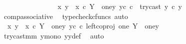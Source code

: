 \begin{isabellebody}
\ \ \ \ \ \ \ \ \ \ \ \ \isamarkupfalse%
\ \isamarkupfalse%
\ {\isachardoublequoteopen}{\isachardot}{\kern0pt}{\isachardot}{\kern0pt}{\isachardot}{\kern0pt}\ {\isacharequal}{\kern0pt}\ {\isacharparenleft}{\kern0pt}{\isasymlangle}x{}{\isacharcomma}{\kern0pt}\ y{}{\isasymrangle}\ {\isasymamalg}\ {\isasymlangle}x{}\ {\isasymcirc}\isactrlsub c\ {\isasymbeta}\isactrlbsub Y\ {\isasymsetminus}\ {\isacharparenleft}{\kern0pt}one{\isacharcomma}{\kern0pt}y{}{\isacharparenright}{\kern0pt}\isactrlesub {\isacharcomma}{\kern0pt}\ y{}\isactrlsup c{\isasymrangle}{\isacharparenright}{\kern0pt}\ {\isasymcirc}\isactrlsub c\ \ try{\isacharunderscore}{\kern0pt}cast\ y{}\ {\isasymcirc}\isactrlsub c\ y{}{\isachardoublequoteclose}\isanewline
\ \ \ \ \ \ \ \ \ \ \ \ \ \ \isamarkupfalse%
\ \ comp{\isacharunderscore}{\kern0pt}associative{}\ \isamarkupfalse%
\ {\isacharparenleft}{\kern0pt}typecheck{\isacharunderscore}{\kern0pt}cfuncs{\isacharcomma}{\kern0pt}\ auto{\isacharparenright}{\kern0pt}\isanewline
\ \ \ \ \ \ \ \ \ \ \ \ \isamarkupfalse%
\ \isamarkupfalse%
\ {\isachardoublequoteopen}{\isachardot}{\kern0pt}{\isachardot}{\kern0pt}{\isachardot}{\kern0pt}\ {\isacharequal}{\kern0pt}\ {\isacharparenleft}{\kern0pt}{\isasymlangle}x{}{\isacharcomma}{\kern0pt}\ y{}{\isasymrangle}\ {\isasymamalg}\ {\isasymlangle}x{}\ {\isasymcirc}\isactrlsub c\ {\isasymbeta}\isactrlbsub Y\ {\isasymsetminus}\ {\isacharparenleft}{\kern0pt}one{\isacharcomma}{\kern0pt}y{}{\isacharparenright}{\kern0pt}\isactrlesub {\isacharcomma}{\kern0pt}\ y{}\isactrlsup c{\isasymrangle}{\isacharparenright}{\kern0pt}\ {\isasymcirc}\isactrlsub c\ left{\isacharunderscore}{\kern0pt}coproj\ one\ {\isacharparenleft}{\kern0pt}Y\ {\isasymsetminus}\ {\isacharparenleft}{\kern0pt}one{\isacharcomma}{\kern0pt}y{}{\isacharparenright}{\kern0pt}{\isacharparenright}{\kern0pt}{\isachardoublequoteclose}\isanewline
\ \ \ \ \ \ \ \ \ \ \ \ \ \ \isamarkupfalse%
\ \ try{\isacharunderscore}{\kern0pt}cast{\isacharunderscore}{\kern0pt}m{\isacharunderscore}{\kern0pt}m\ y{}{\isacharunderscore}{\kern0pt}mono\ y{}y{}{\isacharunderscore}{\kern0pt}def{\isacharparenleft}{\kern0pt}{}{\isacharparenright}{\kern0pt}\ \isamarkupfalse%
\ auto\isanewline
\ \ \ \ \ \ \ \ \ \ \ \ \isamarkupfalse%
\ \isamarkupfalse%

\end{isabellebody}

